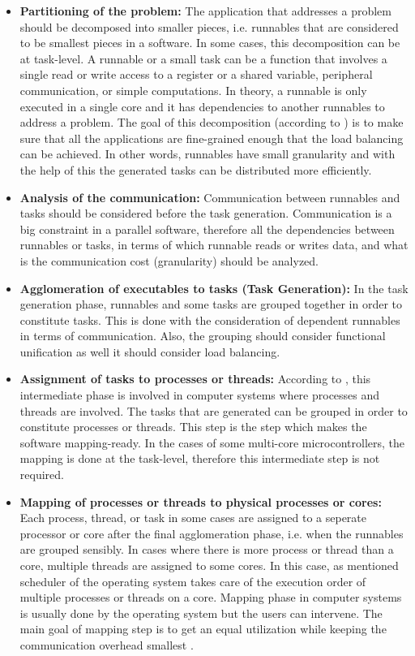 \begin{itemize}
	\item \textbf{Partitioning of the problem:}
	The application that addresses a problem should be decomposed into smaller pieces, i.e. runnables that are considered to be smallest pieces in a software. In some cases, this decomposition can be at task-level. A runnable or a small task can be a function that involves a single read or write access to a register or a shared variable, peripheral communication, or simple computations. In theory, a runnable is only executed in a single core and it has dependencies to another runnables to address a problem. The goal of this decomposition (according to \cite{springerparallel}) is to make sure that all the applications are fine-grained enough that the load balancing can be achieved. In other words, runnables have small granularity and with the help of this the generated tasks can be distributed more efficiently.
	\item \textbf{Analysis of the communication:} Communication between runnables and tasks should be considered before the task generation. Communication is a big constraint in a parallel software, therefore all the dependencies between runnables or tasks, in terms of which runnable reads or writes data, and what is the communication cost (granularity) should be analyzed.
	\item \textbf{Agglomeration of executables to tasks (Task Generation):}
	In the task generation phase, runnables and some tasks are grouped together in order to constitute tasks. This is done with the consideration of dependent runnables in terms of communication. Also, the grouping should consider functional unification as well it should consider load balancing. 
	\item \textbf{Assignment of tasks to processes or threads:}
	According to \cite{springerparallel}, this intermediate phase is involved in computer systems where processes and threads are involved. The tasks that are generated can be grouped in order to constitute processes or threads. This step is the step which makes the software mapping-ready. In the cases of some multi-core microcontrollers, the mapping is done at the task-level, therefore this intermediate step is not required.
	\item \textbf{Mapping of processes or threads to physical processes or cores:}
	Each process, thread, or task in some cases are assigned to a seperate processor or core after the final agglomeration phase, i.e. when the runnables are grouped sensibly. In cases where there is more process or thread than a core, multiple threads are assigned to some cores. In this case, as mentioned scheduler of the operating system takes care of the execution order of multiple processes or threads on a core. Mapping phase in computer systems is usually done by the operating system but the users can intervene. The main goal of mapping step is to get an equal utilization while keeping the communication overhead smallest \cite{springerparallel} \cite{lukas1}.
\end{itemize}

